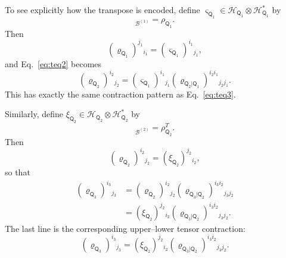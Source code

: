 \documentclass[
    aps,
    pra,
    reprint,
    superscriptaddress,
    nofootinbib
]{revtex4-2}
\theoremstyle{definition}
\theoremstyle{plain}
\begin{document}
To see explicitly how the transpose is encoded, define
$\varsigma_{\mathsf{Q}_{1}}\in
\mathcal{H}_{\mathsf{Q}_{1}}\otimes
\mathcal{H}_{\mathsf{Q}_{1}}^{*}$ by
\begin{equation}
    [\varsigma_{\mathsf{Q}_{1}}]_{\mathcal{B}^{(1)}}
    =
    \rho_{\mathsf{Q}_{1}}.
\end{equation}
Then
\begin{equation}
    \left(\varrho_{\mathsf{Q}_{1}}\right)^{j_{1}}{}_{i_{1}}
    =
    \left(\varsigma_{\mathsf{Q}_{1}}\right)^{i_{1}}{}_{j_{1}},
\end{equation}
and Eq.~\eqref{eq:teq2} becomes
\begin{equation}
    \left(\varrho_{\mathsf{Q}_{2}}\right)^{i_{2}}{}_{j_{2}}
    =
    \left(\varsigma_{\mathsf{Q}_{1}}\right)^{i_{1}}{}_{j_{1}}
    \left(\varrho_{\mathsf{Q}_{2}|\mathsf{Q}_{1}}\right)
    ^{i_{2}i_{1}}{}_{j_{2}j_{1}}.
    \label{eq:teq4}
\end{equation}
This has exactly the same contraction pattern as
Eq.~\eqref{eq:teq3}.

Similarly, define
$\xi_{\mathsf{Q}_{2}}\in
\mathcal{H}_{\mathsf{Q}_{2}}\otimes
\mathcal{H}_{\mathsf{Q}_{2}}^{*}$ by
\begin{equation}
    [\xi_{\mathsf{Q}_{2}}]_{\mathcal{B}^{(2)}}
    =
    \rho_{\mathsf{Q}_{2}}^{T}.
\end{equation}
Then
\begin{equation}
    \left(\varrho_{\mathsf{Q}_{2}}\right)^{i_{2}}{}_{j_{2}}
    =
    \left(\xi_{\mathsf{Q}_{2}}\right)^{j_{2}}{}_{i_{2}},
\end{equation}
so that
\begin{align}
    \left(\varrho_{\mathsf{Q}_{3}}\right)^{i_{3}}{}_{j_{3}}
    &=
    \left(\varrho_{\mathsf{Q}_{2}}\right)^{i_{2}}{}_{j_{2}}
    \left(\varrho_{\mathsf{Q}_{3}|\mathsf{Q}_{2}}\right)
    ^{i_{3}i_{2}}{}_{j_{3}j_{2}}\\
    &=
    \left(\xi_{\mathsf{Q}_{2}}\right)^{j_{2}}{}_{i_{2}}
    \left(\varrho_{\mathsf{Q}_{3}|\mathsf{Q}_{2}}\right)
    ^{i_{3}i_{2}}{}_{j_{3}j_{2}}.
\end{align}
The last line is the corresponding upper--lower tensor contraction:
\begin{equation}
    \left(\varrho_{\mathsf{Q}_{3}}\right)^{i_{3}}{}_{j_{3}}
    =
    \left(\xi_{\mathsf{Q}_{2}}\right)^{j_{2}}{}_{i_{2}}
    \left(\varrho_{\mathsf{Q}_{3}|\mathsf{Q}_{2}}\right)
    ^{i_{3}i_{2}}{}_{j_{3}j_{2}}.
\end{equation}
\end{document}
